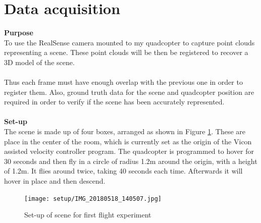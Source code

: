\documentclass[12pt,a4paper]{article}
\begin{document}
\section{Data acquisition}
\textbf{Purpose} \\
To use the RealSense camera mounted to my quadcopter to capture point clouds representing a scene. These point clouds will be then be registered to recover a 3D model of the scene.
\\\\
Thus each frame must have enough overlap with the previous one in order to register them. Also, ground truth data for the scene and quadcopter position are required in order to verify if the scene has been accurately represented.
\\\\
\textbf{Set-up} \\
The scene is made up of four boxes, arranged as shown in Figure \ref{f: e1 r2 setup}. These are place in the center of the room, which is currently set as the origin of the Vicon assisted velocity controller program. The quadcopter is programmed to hover for 30 seconds and then fly in a circle of radius 1.2m around the origin, with a height of 1.2m. It flies around twice, taking 40 seconds each time. Afterwards it will hover in place and then descend. 
\begin{figure}[h]
	\centering
    \texttt{[image: setup/IMG\_20180518\_140507.jpg]}
	\caption{Set-up of scene for first flight experiment}
	\label{f: e1 r2 setup}
\end{figure}
\end{document}
